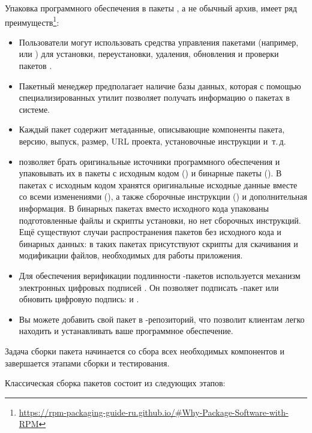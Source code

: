 Упаковка программного обеспечения в пакеты , а не обычный архив, имеет ряд
преимуществ\footnote{\href{https://rpm-packaging-guide-ru.github.io/\#Why-Package-Software-with-RPM}
	{https://rpm-packaging-guide-ru.github.io/\#Why-Package-Software-with-RPM}}:

\begin{itemize}
	\item Пользователи могут использовать средства управления пакетами (например,  или 
	) для установки, переустановки, удаления, обновления и проверки пакетов .
	\item Пакетный менеджер  предполагает наличие базы данных, которая с помощью специализированных 
	утилит позволяет получать информацию о пакетах в системе.
	\item Каждый пакет  содержит метаданные, описывающие компоненты пакета, версию, выпуск, 
	размер, URL проекта, установочные инструкции и~т.\,д.
	\item {} позволяет брать оригинальные источники программного обеспечения и упаковывать их в 
	пакеты с исходным кодом () и бинарные пакеты (). В пакетах с исходным кодом 
	хранятся оригинальные исходные данные вместе со всеми изменениями (), а также сборочные 
	инструкции () и дополнительная информация. В бинарных пакетах вместо исходного кода 
	упакованы подготовленные файлы и скрипты установки, но нет сборочных инструкций. Ещё существуют 
	случаи распространения пакетов без исходного кода и бинарных данных: в таких пакетах присутствуют 
	скрипты для скачивания и модификации файлов, необходимых для работы приложения.
	\item Для обеспечения верификации подлинности -пакетов используется механизм электронных цифровых 
	подписей . Он позволяет подписать -пакет или обновить цифровую подпись: 
	 и .
	\item Вы можете добавить свой пакет в -репозиторий, что позволит клиентам легко находить и 
	устанавливать ваше программное обеспечение.
\end{itemize}

Задача сборки пакета начинается со сбора всех необходимых компонентов и завершается этапами сборки и тестирования.

Классическая сборка пакетов  состоит из следующих этапов:%

